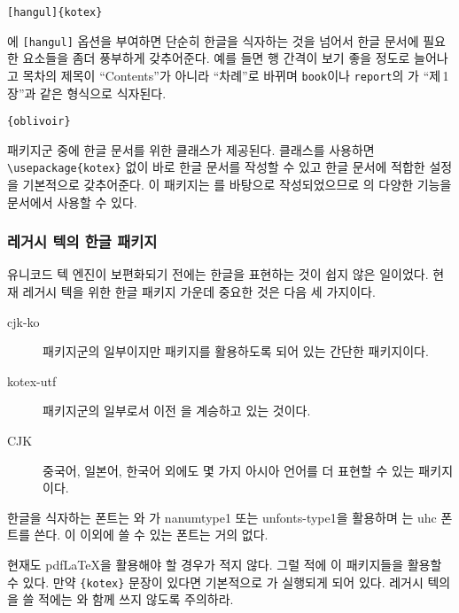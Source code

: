 \begin{lscommand}
  \verb|[hangul]{kotex}|
\end{lscommand}
\noindent {}에 \verb|[hangul]| 옵션을 부여하면 
단순히 한글을 식자하는 것을 넘어서 한글 문서에 필요한 요소들을 좀더 풍부하게 갖추어준다.
예를 들면 행 간격이 보기 좋을 정도로 늘어나고 목차의 제목이 ``Contents''가 아니라 ``차례''로 
바뀌며 \texttt{book}이나 \texttt{report}의 가 ``제\,1\,장''과 같은 형식으로 식자된다.

\begin{lscommand}
  \verb|{oblivoir}|
\end{lscommand}
 패키지군 중에 한글 문서를 위한 클래스가 제공된다.  클래스를 사용하면 
\verb|\usepackage{kotex}| 없이 바로 한글 문서를 작성할 수 있고 한글 문서에 적합한 설정을
기본적으로 갖추어준다. 이 패키지는 를 
바탕으로 작성되었으므로 의 다양한 기능을 문서에서 사용할 수 있다.


\subsubsection{레거시 텍의 한글 패키지}

유니코드 텍 엔진이 보편화되기 전에는 한글을 표현하는 것이 쉽지 않은 일이었다. 
현재 레거시 텍을 위한 한글 패키지 가운데 중요한 것은 다음 세 가지이다.
\begin{description}
  \item[cjk-ko]  패키지군의 일부이지만  패키지를 활용하도록 되어 있는 간단한 패키지이다.
  \item[kotex-utf]  패키지군의 일부로서 이전 \HLaTeX 을 계승하고 있는 것이다. 
  \item[CJK] 중국어, 일본어, 한국어 외에도 몇 가지 아시아 언어를 더 표현할 수 있는 패키지이다.
\end{description}
한글을 식자하는 폰트는 와 가 nanumtype1 또는 unfonts-type1을 활용하며
는 uhc 폰트를 쓴다. 이 이외에 쓸 수 있는 폰트는 거의 없다. 

현재도 pdf\LaTeX 을 활용해야 할 경우가 적지 않다. 그럴 적에 이 패키지들을 활용할 수 있다. 만약 \verb|{kotex}|
문장이 있다면 기본적으로 가 실행되게 되어 있다. 레거시 텍의 을 쓸 적에는 와
함께 쓰지 않도록 주의하라.


